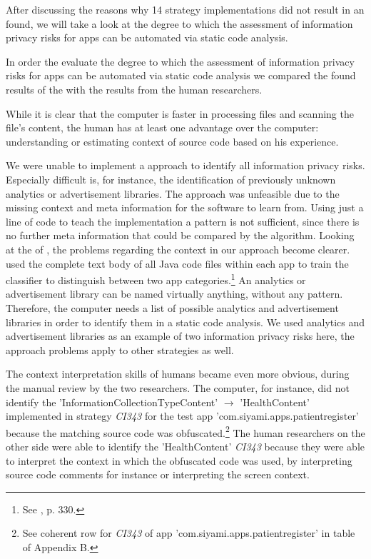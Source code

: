After discussing the reasons why 14 strategy implementations did not result in an \ipr found, we will take a look at the degree to which the assessment of information privacy risks for \mH apps can be automated via static code analysis.

In order the evaluate the degree to which the assessment of information privacy risks for \mH apps can be automated via static code analysis we compared the \ipr found results of the \aiprat with the results from the human researchers.

While it is clear that the computer is faster in processing files and scanning the file's content, the human has at least one advantage over the computer: understanding or estimating context of source code based on his experience.

We were unable to implement a \ml approach to identify all information privacy risks.
Especially difficult is, for instance, the identification of previously unknown analytics or advertisement libraries.
The \ml approach was unfeasible due to the missing context and meta information for the software to learn from.
Using just a line of code to teach the \ml implementation a pattern is not sufficient, since there is no further meta information that could be compared by the algorithm.
Looking at the \ml of \textcite{Shabtai2010}, the problems regarding the context in our approach become clearer.
\textcite{Shabtai2010} used the complete text body of all Java code files within each app to train the \ml classifier to distinguish between two app categories.\footnote{See \cite{Shabtai2010}, p. 330.}
An analytics or advertisement library can be named virtually anything, without any pattern.
Therefore, the computer needs a list of possible analytics and advertisement libraries in order to identify them in a static code analysis.
We used analytics and advertisement libraries as an example of two information privacy risks here, the \ml approach problems apply to other \ipr strategies as well.

The context interpretation skills of humans became even more obvious, during the manual review by the two researchers.
The computer, for instance, did not identify the \ipr 'InformationCollectionTypeContent' $\rightarrow$ 'HealthContent' implemented in strategy \textit{CI343} for the test app 'com.siyami.apps.patientregister' because the matching source code was obfuscated.\footnote{See coherent row for \textit{CI343} of app 'com.siyami.apps.patientregister'  in table of Appendix B.}
The human researchers on the other side were able to identify the 'HealthContent' \textit{CI343} \ipr because they were able to interpret the context in which the obfuscated code was used, by interpreting source code comments for instance or interpreting the screen context.

